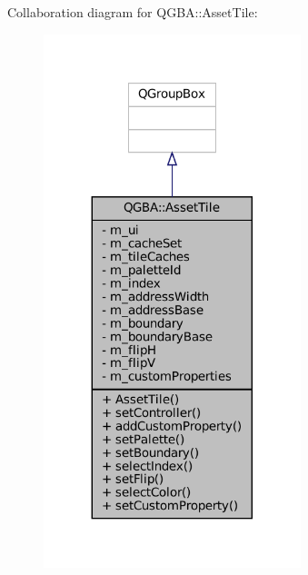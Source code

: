 Collaboration diagram for Q\+G\+BA\+:\+:Asset\+Tile\+:
\nopagebreak
\begin{figure}[H]
\begin{center}
\leavevmode
\includegraphics[width=212pt]{class_q_g_b_a_1_1_asset_tile__coll__graph}
\end{center}
\end{figure}
